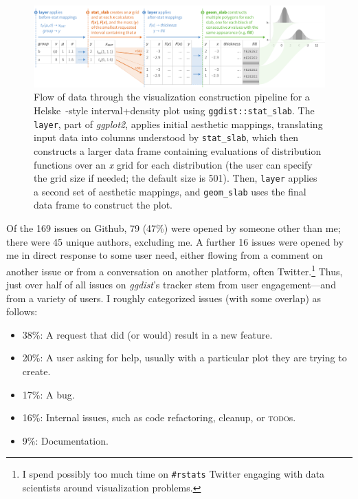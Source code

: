 \documentclass[journal]{vgtc}                     %
\begin{document}
\begin{figure}[t!]
\vspace*{-10pt}
\includegraphics[width=\textwidth]{figs/4-slab_pipeline.pdf}
\vspace*{-17pt}
\caption{Flow of data through the visualization construction pipeline for a Helske~\cite{helske2021can}-style interval+density plot using \texttt{ggdist::stat\_slab}. The \texttt{layer}, part of \textit{ggplot2}, applies initial aesthetic mappings, translating input data into columns understood by \texttt{stat\_slab}, which then constructs a larger data frame containing evaluations of distribution functions over an \textit{x} grid for each distribution (the user can specify the grid size if needed; the default size is 501). Then, \texttt{layer} applies a second set of aesthetic mappings, and \texttt{geom\_slab} uses the final data frame to construct the plot.}
\vspace*{-13pt}
\label{fig:implementation}
\end{figure}


Of the 169 issues on Github, 79 (47\%) were opened by someone other than me; there were 45 unique authors, excluding me. A further 16 issues were opened by me in direct response to some user need, either flowing from a comment on another issue or from a conversation on another platform, often Twitter.\footnote{I spend possibly too much time on \texttt{\#rstats} Twitter engaging with data scientists around visualization problems.} Thus, just over half of all issues on \textit{ggdist}'s tracker stem from user engagement---and from a variety of users. I roughly categorized issues (with some overlap) as follows:

\begin{itemize}
\setlength{\parskip}{0pt}
    \item 38\%: A request that did (or would) result in a new feature.
    \item 20\%: A user asking for help, usually with a particular plot they are trying to create.
    \item 17\%: A bug.
    \item 16\%: Internal issues, such as code refactoring, cleanup, or \textsc{todo}s.
    \item 9\%: Documentation.
\end{itemize}
\end{document}

